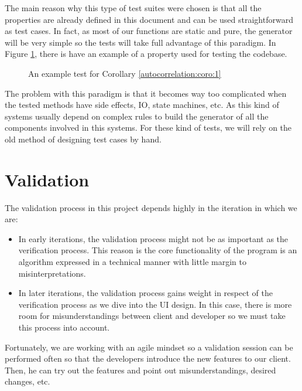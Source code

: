     The main reason why this type of test suites were chosen is that all the
    properties are already defined in this document and can be used
    straightforward as test cases. In fact, as most of our functions
    are static and pure, the generator will be very simple so the
    tests will take full advantage of this paradigm. In Figure \ref{test_example},
    there is have an example of a property used for testing the codebase.\\

    \begin{figure}[ht!]
      \caption{An example test for Corollary \ref{autocorrelation:coro:1}}
      \label{test_example}
    \end{figure}

    The problem with this paradigm is that it becomes way too complicated when
    the tested methods have side effects, IO, state machines, etc. As this
    kind of systems usually depend on complex rules to build the generator of
    all the components involved in this systems. For these kind of tests, we
    will rely on the old method of designing test cases by hand.\\

\section{Validation}

The validation process in this project depends highly in the iteration in which
we are:

\begin{itemize}
  \item In early iterations, the validation process might not be as important
  as the verification process. This reason is the core functionality of the
  program is an algorithm expressed in a technical manner with little margin
  to misinterpretations.
  \item In later iterations, the validation process gains weight in respect of
  the verification process as we dive into the UI design. In this case, there
  is more room for misunderstandings between client and developer so we must
  take this process into account.
\end{itemize}

Fortunately, we are working with an agile mindset so a validation
session can be performed often so that the developers introduce the new features to
our client. Then, he can try out the features and point out misunderstandings,
desired changes, etc.\\

